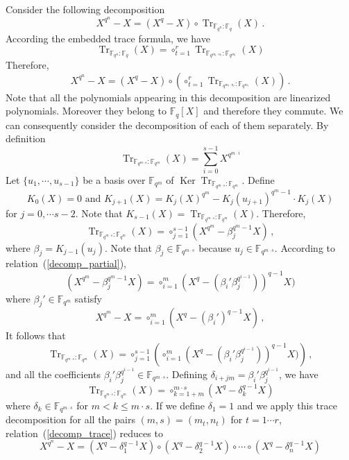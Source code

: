 \documentclass{sig-alternate}
\newcommand{\ff}[1]{\mathbb{F}_{#1}}
\newcommand{\qq}{q}
\newcommand{\nn}{n}
\newcommand{\basef}{\ff{\qq}}
\DeclareMathOperator{\Tr}{Tr}
\DeclareMathOperator{\Ker}{Ker}
\newcommand{\tr}[2]{\Tr_{\ff{#1}:\ff{#2}}}
\begin{document}
\medskip

\noindent Consider the following decomposition
$$X^{\qq^{\nn}}-X=(X^{\qq}-X) \circ   \tr{\qq^\nn}{\qq}(X)  \,.  $$
According the embedded trace formula, we have
$$\tr{\qq^\nn}{\qq}(X)=\circ_{t=1}^r  \tr{\qq^{m_t \cdot n_t}}{\qq^{m_{t}}}(X) $$
Therefore, 
 \begin{equation}
 \label{decomp_trace}
 X^{\qq^{\nn}}-X=(X^{\qq}-X) \circ \left( \circ_{t=1}^r  \tr{\qq^{m_t \cdot n_t}}{\qq^{m_{t}}}(X) \right)     \,. 
\end{equation}
Note that all the polynomials appearing in this decomposition are linearized polynomials. Moreover they belong to $\basef[X]$ and therefore they commute.
 We can consequently consider the decomposition of each of them separately. By definition
 $$  \tr{\qq^{m \cdot s}}{\qq^{m}}(X) =\sum_{i=0}^{s-1} X^{\qq^{m\cdot i}}  $$
 Let $\{u_1, \cdots, u_{s-1}\}$ be a basis over $\mathbb{F}_{\qq^{m}}$ of $\Ker  \tr{\qq^{m \cdot s}}{\qq^{m}}$.
 Define  
 $$K_0(X)=0 \mbox{ and } K_{j+1}(X)=K_j(X)^{\qq^{m}}-K_j(u_{j+1})^{\qq^{m}-1} \cdot K_j(X)$$
 for $j=0, \cdots s-2$. Note that $K_{s-1}(X)=\tr{\qq^{m \cdot s}}{\qq^{m}}(X)$.
 Therefore, 
 \begin{equation}
 \label{betai}
\tr{\qq^{m \cdot s}}{\qq^{m}}(X)=\circ_{j=1}^{s-1} (X^{\qq^{m}} - \beta_j^{\qq^{m}-1}   X) \,,
\end{equation}
 where $\beta_j=K_{j-1}(u_{j})$. Note that $\beta_j \in \mathbb{F}_{\qq^{m \cdot s}}$ because  $u_j \in \mathbb{F}_{\qq^{m \cdot s}}$. According to relation~(\ref{decomp_partial}),
$$(X^{\qq^{m}}- \beta_j^{\qq^{m}-1} X)=\circ_{i=1}^{m} (X^\qq-( \beta_i' \beta_j^{\qq^{i-1}}) )^{q-1} X)$$
where $\beta_j' \in \mathbb{F}_{\qq^m}$ satisfy
\begin{equation}
\label{betajprim}
X^{\qq^{m}}-X=\circ_{i=1}^{m} (X^{\qq}-(\beta_i')^{\qq-1} X)\,,
\end{equation}
It follows that
 $$\tr{\qq^{m \cdot s}}{\qq^{m}}(X)=\circ_{j=1}^{s-1} \left( \circ_{i=1}^{m} (X^\qq-( \beta_i' \beta_j^{\qq^{i-1}}) )^{q-1} X)   \right) \,,$$
and all the coefficients $\beta_i' \beta_j^{\qq^{i-1}} \in \mathbb{F}_{\qq^{m \cdot s}}$.
Defining $\delta_{i+jm}=\beta_i' \beta_j^{\qq^{i-1}} $, we have
$$\tr{\qq^{m \cdot s}}{\qq^{m}}(X)=\circ_{k=1+m}^{m \cdot s}  (X^{\qq} -\delta_k^{\qq-1} X )$$
where $\delta_k \in \mathbb{F}_{\qq^{m \cdot s}}$ for $m  < k \le m \cdot s$. If we define $\delta_1=1$ and we apply this trace decomposition for all the pairs $(m,s)=(m_{t},n_t)$ for $t=1 \cdots r$, 
relation~(\ref{decomp_trace}) reduces to  
$$X^{\qq^{\nn}}-X=(X^{\qq} -\delta_1^{\qq-1} X ) \circ (X^{\qq} -\delta_2^{\qq-1} X ) \circ \cdots \circ (X^{\qq} -\delta_n^{\qq-1} X )$$
\end{document}
